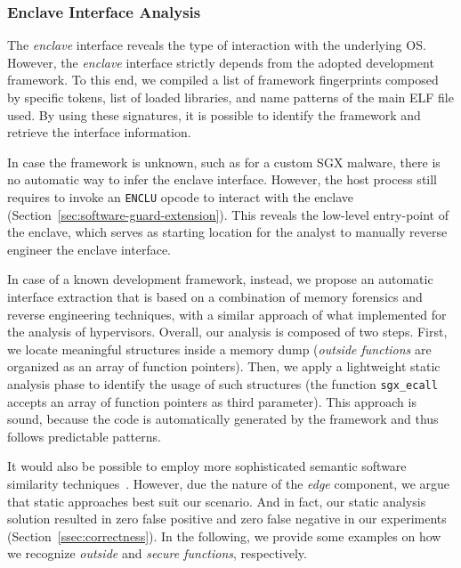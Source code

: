 \subsubsection{Enclave Interface Analysis}

The \emph{enclave} interface reveals the type of interaction with the 
underlying OS.
However, the \emph{enclave} interface strictly depends from the adopted 
development 
framework.
To this end, we compiled a list of framework fingerprints composed by 
specific tokens, list of loaded libraries, and name patterns of the main 
ELF file used. By using these signatures, it is possible to identify the 
framework
and retrieve the interface information.

In case the framework is unknown, such as for a custom 
SGX malware, there is no automatic way to infer the enclave interface. 
However, the host process still requires to invoke an \texttt{ENCLU} opcode to 
interact with the enclave (Section~\ref{sec:software-guard-extension}).
This reveals the low-level entry-point of the enclave, which serves as starting
location for the analyst to manually reverse engineer the enclave interface.

In case of a known development framework, instead, we propose an 
automatic interface extraction that is based on a combination of memory 
forensics and reverse engineering techniques, with a similar approach of what 
\cite{grazianohyper} implemented for the analysis of hypervisors.
Overall, our analysis is composed of two steps. First, we locate meaningful
structures inside a memory dump (\eg \emph{outside functions} are organized as
an array of function pointers). Then, we apply a lightweight static analysis 
phase to identify the
usage of such structures (\eg the function \texttt{sgx\_ecall} accepts an array
of function pointers as third parameter). This approach 
is sound, because the code is automatically generated by the
framework and thus follows predictable patterns.

It would also be possible to employ more sophisticated semantic software 
similarity techniques~\citep{pei2020trex}. However, due the nature of the 
\emph{edge} component, we argue that static approaches best suit our scenario.
And in fact, our static analysis solution resulted in zero false positive and 
zero false negative in our experiments (Section~\ref{ssec:correctness}).
In the following, we provide some examples on how we recognize \emph{outside} 
and \emph{secure functions}, respectively.

